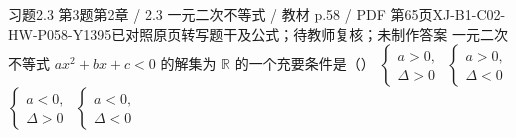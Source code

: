 \par\noindent\begin{minipage}{\linewidth}
\begin{bankitem}{习题2.3 第3题}{第2章 / 2.3 一元二次不等式 / 教材 p.58 / PDF 第65页}{XJ-B1-C02-HW-P058-Y1395}{已对照原页转写题干及公式；待教师复核；未制作答案}
一元二次不等式 $ax^2+bx+c<0$ 的解集为 $\mathbb R$ 的一个充要条件是（\quad）
$\begin{cases}a>0,\\\Delta>0\end{cases}$
$\begin{cases}a>0,\\\Delta<0\end{cases}$
$\begin{cases}a<0,\\\Delta>0\end{cases}$
$\begin{cases}a<0,\\\Delta<0\end{cases}$
\end{bankitem}
\end{minipage}\par\medskip

